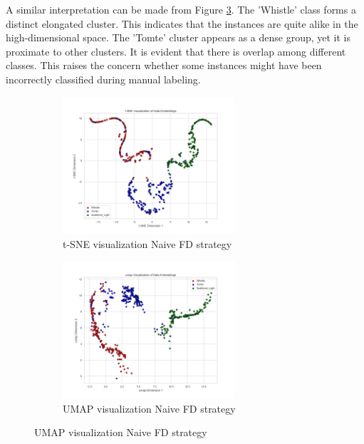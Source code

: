 A similar interpretation can be made from Figure \ref{fig:umap_FD_Naive}. The 'Whistle' class forms a distinct elongated cluster. This indicates that the instances are quite alike in the high-dimensional space. The 'Tomte' cluster appears as a dense group, yet it is proximate to other clusters. It is evident that there is overlap among different classes. This raises the concern whether some instances might have been incorrectly classified during manual labeling. 

\begin{figure}[ht]
\centering
\begin{subfigure}
  \centering
    \includegraphics[width=0.7\textwidth]{Grad Assignment/Images/tSNE_FractalDimension_naive_test.png}
    \caption{t-SNE visualization Naive FD strategy}
    \label{fig:tSNE_FD_Naive}
\end{subfigure}
\begin{subfigure}
  \centering
    \includegraphics[width=0.7\textwidth]{Grad Assignment/Images/umap_FractalDimension_naive_test.png}
    \caption{UMAP visualization Naive FD strategy}
    \label{fig:umap_FD_Naive}
\end{subfigure}
\end{figure}

